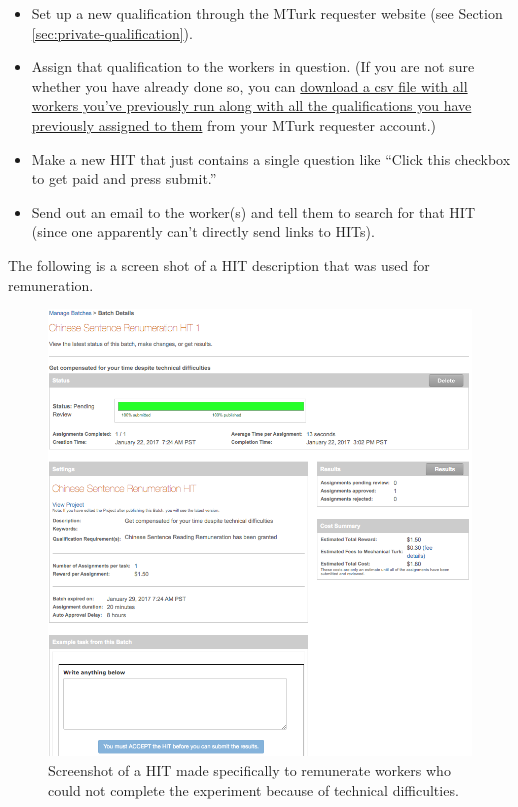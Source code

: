\documentclass{article}
\begin{document}
\begin{itemize}
	\item Set up a new qualification through the MTurk requester website (see Section \ref{sec:private-qualification}).
	\item Assign that qualification to the workers in question. (If you are not sure whether you have already done so, you can  \href{https://requester.mturk.com/workers/download?utf8=\%E2\%9C\%93&check=true}{download a csv file with all workers you've previously run along with all the qualifications you have previously assigned to them} from your MTurk requester account.)
	\item Make a new HIT that just contains a single question like ``Click this checkbox to get paid and press submit.''
	\item Send out an email to the worker(s) and tell them to search for that HIT (since one apparently can't directly send links to HITs).
\end{itemize}

The following is a screen shot of a HIT description that was used for remuneration.

\begin{figure}[htbp]
\begin{center}
\includegraphics[width=.9\textwidth]{figures/remuneration}
\caption{Screenshot of a HIT made specifically to remunerate workers who could not complete the experiment because of technical difficulties.}
\label{default}
\end{center}
\end{figure}
\end{document}
